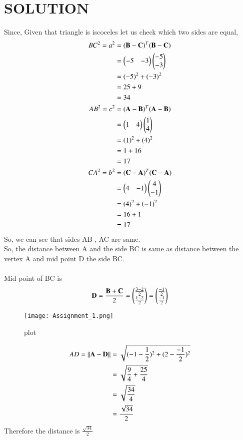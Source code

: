 \documentclass[journal,12pt,twocolumn]{IEEEtran}
\begin{document}
\section*{SOLUTION}
Since, Given that triangle is iscoceles let us check which two sides are equal,
\begin{align*}
    BC^2 = a^2 &= (\mathbf{\mathbf{B} - \mathbf{C}})^T(\mathbf{\mathbf{B} - \mathbf{C}}) \\
    &=  \begin{pmatrix}-5 & -3\end{pmatrix} \begin{pmatrix}-5 \\ -3\end{pmatrix}\\
    &= (-5)^{2}+ (-3)^{2}\\
    &= 25 + 9\\
    &= 34\\
    AB^2 = c^2 &= (\mathbf{\mathbf{A} - \mathbf{B}})^T(\mathbf{\mathbf{A} - \mathbf{B}}) \\
    &=  \begin{pmatrix}1 & 4\end{pmatrix} \begin{pmatrix}1 \\ 4\end{pmatrix}\\
    &= (1)^{2}+ (4)^{2}\\
    &= 1 + 16\\
    &= 17\\
    CA^2 = b^2 &= (\mathbf{\mathbf{C} - \mathbf{A}})^T(\mathbf{\mathbf{C} - \mathbf{A}}) \\
    &=  \begin{pmatrix}4 & -1\end{pmatrix} \begin{pmatrix}4 \\ -1\end{pmatrix}\\
    &= (4)^{2}+ (-1)^{2}\\
    &= 16 + 1\\
    &= 17\\
\end{align*}
So, we can see that sides AB , AC are same.\\
So, the distance between A and the side BC is same as distance between the vertex A and mid point D the side BC.\\\\
Mid point of BC is
\begin{align*}
     \mathbf{D}= \frac{\mathbf{B} + \mathbf{C}}{2} = \begin{pmatrix}\frac{3-2}{2}\\\frac{1-2}{2}\end{pmatrix}=\begin{pmatrix}\frac{-1}{2}\\ \frac{-1}{2}\end{pmatrix}
\end{align*}
\begin{figure}[htp]
    \centering
    \texttt{[image: Assignment\_1.png]}
    \caption{plot}
    \label{fig:my_label}
\end{figure}
\begin{align*}
    AD = \lVert\mathbf{A} - \mathbf{D}\rVert &= \sqrt{(-1-\frac{1}{2})^{2} + (2-\frac{-1}{2})^{2}}\\
    &= \sqrt{\frac{9}{4} + \frac{25}{4}}\\
    &= \sqrt{\frac{34}{4}}\\
    &= \frac{\sqrt{34}}{2}
\end{align*}
Therefore the distance is $\frac{\sqrt{34}}{2}$
\end{document}
